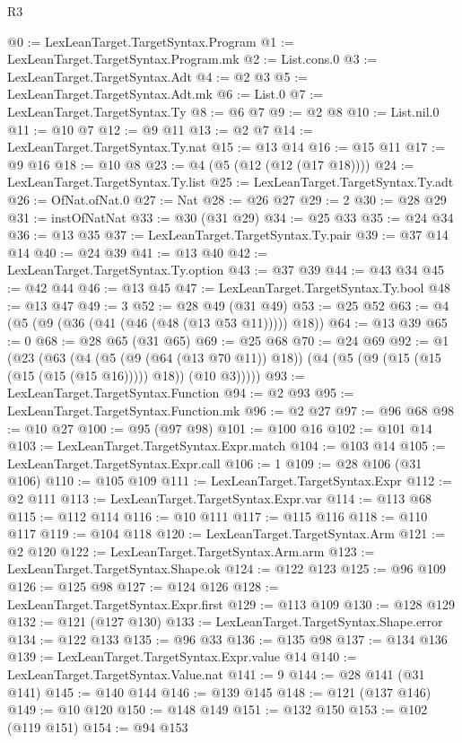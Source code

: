 \begin{lexlean}{R3}
\begin{coremodule}
@0 := LexLeanTarget.TargetSyntax.Program
@1 := LexLeanTarget.TargetSyntax.Program.mk
@2 := List.cons.{0}
@3 := LexLeanTarget.TargetSyntax.Adt
@4 := @2 @3
@5 := LexLeanTarget.TargetSyntax.Adt.mk
@6 := List.{0}
@7 := LexLeanTarget.TargetSyntax.Ty
@8 := @6 @7
@9 := @2 @8
@10 := List.nil.{0}
@11 := @10 @7
@12 := @9 @11
@13 := @2 @7
@14 := LexLeanTarget.TargetSyntax.Ty.nat
@15 := @13 @14
@16 := @15 @11
@17 := @9 @16
@18 := @10 @8
@23 := @4 (@5 (@12 (@12 (@17 @18))))
@24 := LexLeanTarget.TargetSyntax.Ty.list
@25 := LexLeanTarget.TargetSyntax.Ty.adt
@26 := OfNat.ofNat.{0}
@27 := Nat
@28 := @26 @27
@29 := 2
@30 := @28 @29
@31 := instOfNatNat
@33 := @30 (@31 @29)
@34 := @25 @33
@35 := @24 @34
@36 := @13 @35
@37 := LexLeanTarget.TargetSyntax.Ty.pair
@39 := @37 @14 @14
@40 := @24 @39
@41 := @13 @40
@42 := LexLeanTarget.TargetSyntax.Ty.option
@43 := @37 @39
@44 := @43 @34
@45 := @42 @44
@46 := @13 @45
@47 := LexLeanTarget.TargetSyntax.Ty.bool
@48 := @13 @47
@49 := 3
@52 := @28 @49 (@31 @49)
@53 := @25 @52
@63 := @4 (@5 (@9 (@36 (@41 (@46 (@48 (@13 @53 @11))))) @18))
@64 := @13 @39
@65 := 0
@68 := @28 @65 (@31 @65)
@69 := @25 @68
@70 := @24 @69
@92 := @1
    (@23
      (@63
        (@4
          (@5 (@9 (@64 (@13 @70 @11)) @18))
          (@4 (@5 (@9 (@15 (@15 (@15 (@15 (@15 @16))))) @18)) (@10 @3)))))
@93 := LexLeanTarget.TargetSyntax.Function
@94 := @2 @93
@95 := LexLeanTarget.TargetSyntax.Function.mk
@96 := @2 @27
@97 := @96 @68
@98 := @10 @27
@100 := @95 (@97 @98)
@101 := @100 @16
@102 := @101 @14
@103 := LexLeanTarget.TargetSyntax.Expr.match
@104 := @103 @14
@105 := LexLeanTarget.TargetSyntax.Expr.call
@106 := 1
@109 := @28 @106 (@31 @106)
@110 := @105 @109
@111 := LexLeanTarget.TargetSyntax.Expr
@112 := @2 @111
@113 := LexLeanTarget.TargetSyntax.Expr.var
@114 := @113 @68
@115 := @112 @114
@116 := @10 @111
@117 := @115 @116
@118 := @110 @117
@119 := @104 @118
@120 := LexLeanTarget.TargetSyntax.Arm
@121 := @2 @120
@122 := LexLeanTarget.TargetSyntax.Arm.arm
@123 := LexLeanTarget.TargetSyntax.Shape.ok
@124 := @122 @123
@125 := @96 @109
@126 := @125 @98
@127 := @124 @126
@128 := LexLeanTarget.TargetSyntax.Expr.first
@129 := @113 @109
@130 := @128 @129
@132 := @121 (@127 @130)
@133 := LexLeanTarget.TargetSyntax.Shape.error
@134 := @122 @133
@135 := @96 @33
@136 := @135 @98
@137 := @134 @136
@139 := LexLeanTarget.TargetSyntax.Expr.value @14
@140 := LexLeanTarget.TargetSyntax.Value.nat
@141 := 9
@144 := @28 @141 (@31 @141)
@145 := @140 @144
@146 := @139 @145
@148 := @121 (@137 @146)
@149 := @10 @120
@150 := @148 @149
@151 := @132 @150
@153 := @102 (@119 @151)
@154 := @94 @153

\end{coremodule}
\end{lexlean}
